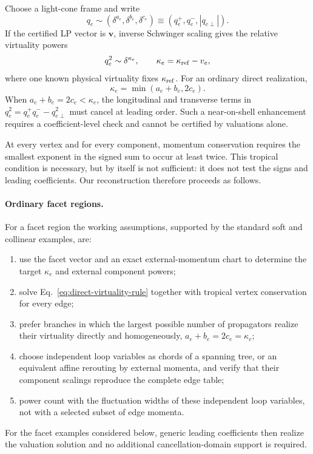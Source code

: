 \documentclass[a4paper,11pt]{article}
\begin{document}
Choose a light-cone frame and write
\begin{equation}
 q_e\sim(\delta^{a_e},\delta^{b_e},\delta^{c_e})
 \equiv(q_e^+,q_e^-,|q_{e\perp}|).
 \label{eq:edge-component-powers}
\end{equation}
If the certified LP vector is \(\boldsymbol v\), inverse Schwinger scaling
gives the relative virtuality powers
\begin{equation}
 q_e^2\sim\delta^{\kappa_e},\qquad
 \kappa_e=\kappa_{\rm ref}-v_e,
 \label{eq:inverse-schwinger-rule}
\end{equation}
where one known physical virtuality fixes \(\kappa_{\rm ref}\).  For an
ordinary direct realization,
\begin{equation}
 \kappa_e=\min(a_e+b_e,2c_e).
 \label{eq:direct-virtuality-rule}
\end{equation}
When \(a_e+b_e=2c_e<\kappa_e\), the longitudinal and transverse terms in
\(q_e^2=q_e^+q_e^- -q_{e\perp}^2\) must cancel at leading order.  Such a
near-on-shell enhancement requires a coefficient-level check and cannot be
certified by valuations alone.

At every vertex and for every component, momentum conservation requires the
smallest exponent in the signed sum to occur at least twice.  This tropical
condition is necessary, but by itself is not sufficient: it does not test
the signs and leading coefficients.  Our reconstruction therefore proceeds
as follows.

\paragraph{Ordinary facet regions.}

For a facet region the working assumptions, supported by the standard soft
and collinear examples, are:
\begin{enumerate}[label=(\roman*)]
 \item use the facet vector and an exact external-momentum chart to determine
 the target \(\kappa_e\) and external component powers;
 \item solve Eq.~\eqref{eq:direct-virtuality-rule} together with tropical
 vertex conservation for every edge;
 \item prefer branches in which the largest possible number of propagators
 realize their virtuality directly and homogeneously,
 \(a_e+b_e=2c_e=\kappa_e\);
 \item choose independent loop variables as chords of a spanning tree, or an
 equivalent affine rerouting by external momenta, and verify that their
 component scalings reproduce the complete edge table;
 \item power count with the fluctuation widths of these independent loop
 variables, not with a selected subset of edge momenta.
\end{enumerate}
For the facet examples considered below, generic leading coefficients then
realize the valuation solution and no additional cancellation-domain support
is required.
\end{document}
